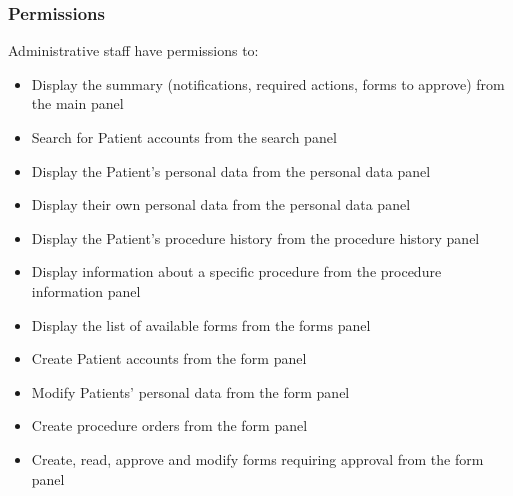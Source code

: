 \subsubsection{Permissions}
Administrative staff have permissions to:\begin{itemize}
    \item Display the summary (notifications, required actions, forms to approve) from the main panel
    \item Search for Patient accounts from the search panel
    \item Display the Patient's personal data from the personal data panel
    \item Display their own personal data from the personal data panel
    \item Display the Patient's procedure history from the procedure history panel
    \item Display information about a specific procedure from the procedure information panel
    \item Display the list of available forms from the forms panel
    \item Create Patient accounts from the form panel
    \item Modify Patients' personal data from the form panel
    \item Create procedure orders from the form panel
    \item Create, read, approve and modify forms requiring approval from the form panel
\end{itemize}
